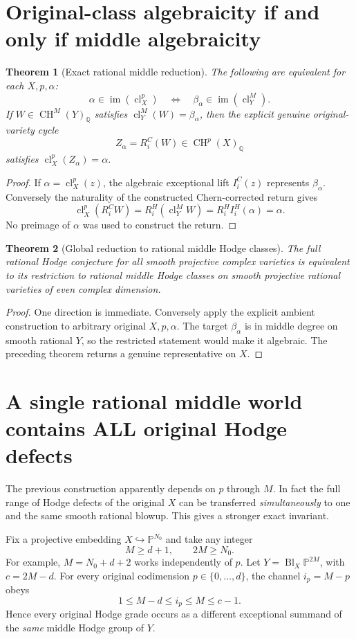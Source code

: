 \documentclass[11pt]{article}
\newcommand{\Q}{\mathbb Q}
\newcommand{\CH}{\operatorname{CH}}
\newcommand{\cl}{\operatorname{cl}}
\newtheorem{theorem}{Theorem}
\begin{document}
\section{Original-class algebraicity if and only if middle algebraicity}
\begin{theorem}[Exact rational middle reduction]
The following are equivalent for each $X,p,\alpha$:
\[
 \alpha\in\operatorname{im}(\cl_X^p)
 \quad\Longleftrightarrow\quad
 \beta_\alpha\in\operatorname{im}(\cl_Y^M).
\]
If $W\in\CH^M(Y)_{\Q}$ satisfies $\cl_Y^M(W)=\beta_\alpha$,
then the explicit genuine original-variety cycle
\[
 Z_\alpha=R_i^C(W)\in\CH^p(X)_{\Q}
\]
satisfies $\cl_X^p(Z_\alpha)=\alpha$.
\end{theorem}
\begin{proof}
If $\alpha=\cl_X^p(z)$, the algebraic exceptional lift $I_i^C(z)$
represents $\beta_\alpha$. Conversely the naturality
of the constructed Chern-corrected return gives
\[
 \cl_X^p(R_i^C W)=R_i^H(\cl_Y^M W)
  =R_i^HI_i^H(\alpha)=\alpha.
\]
No preimage of $\alpha$ was used to construct the return.
\end{proof}
\begin{theorem}[Global reduction to rational middle Hodge classes]
The full rational Hodge conjecture for all smooth projective complex
varieties is equivalent to its restriction to rational middle
Hodge classes on smooth projective rational varieties of even
complex dimension.
\end{theorem}
\begin{proof}
One direction is immediate. Conversely apply the explicit
ambient construction to arbitrary original $X,p,\alpha$.
The target $\beta_\alpha$ is in middle degree on smooth rational $Y$,
so the restricted statement would make it algebraic.
The preceding theorem returns a genuine representative on $X$.
\end{proof}

\section{A single rational middle world contains ALL original Hodge defects}
The previous construction apparently depends on $p$ through $M$.
In fact the full range of Hodge defects of the original $X$
can be transferred \emph{simultaneously} to one and the same
smooth rational blowup. This gives a stronger exact invariant.

Fix a projective embedding $X\hookrightarrow\mathbb P^{N_0}$
and take any integer
\[
 M\ge d+1,\qquad 2M\ge N_0.
\]
For example, $M=N_0+d+2$ works independently of $p$.
Let $Y=\operatorname{Bl}_X\mathbb P^{2M}$, with
$c=2M-d$. For every original codimension $p\in\{0,\dots,d\}$,
the channel $i_p=M-p$ obeys
\[
 1\le M-d\le i_p\le M\le c-1.
\]
Hence every original Hodge grade occurs as a different exceptional
summand of the \emph{same} middle Hodge group of $Y$.
\end{document}

